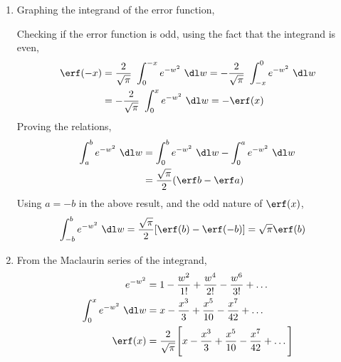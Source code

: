 \begin{enumerate}
    \item Graphing the integrand of the error function,
          \begin{figure}[H]
              \centering
          \end{figure}
          Checking if the error function is odd, using the fact that the integrand
          is even,
          \begin{align}
              \erf(-x) & = \frac{2}{\sqrt{\pi}}\ \int_{0}^{-x} e^{-w^2}\ \dl w
              = -\frac{2}{\sqrt{\pi}}\ \int_{-x}^{0} e^{-w^2}\ \dl w           \\
                       & = -\frac{2}{\sqrt{\pi}}\ \int_{0}^{x} e^{-w^2}\ \dl w
              = -\erf(x)
          \end{align}
          Proving the relations,
          \begin{align}
              \int_{a}^{b} e^{-w^2}\ \dl w & = \int_{0}^{b} e^{-w^2}\ \dl w
              - \int_{0}^{a} e^{-w^2}\ \dl w                                          \\
                                           & = \frac{\sqrt{\pi}}{2} (\erf b - \erf a)
          \end{align}
          Using $ a = -b $ in the above result, and the odd nature of $ \erf(x) $,
          \begin{align}
              \int_{-b}^{b} e^{-w^2}\ \dl w & = \frac{\sqrt{\pi}}{2}
              [\erf(b) - \erf(-b)] = \sqrt{\pi} \erf(b)
          \end{align}

    \item From the Maclaurin series of the integrand,
          \begin{align}
              e^{-w^2} & = 1 - \frac{w^2}{1!} + \frac{w^4}{2!} - \frac{w^6}{3!}
              + \dots                                                                  \\
              \int_{0}^{x} e^{-w^2}
              \ \dl w  & = x - \frac{x^3}{3} + \frac{x^5}{10} - \frac{x^7}{42} + \dots \\
              \erf(x)  & = \frac{2}{\sqrt{\pi}} \Bigg[ x - \frac{x^3}{3}
                  + \frac{x^5}{10} - \frac{x^7}{42} + \dots \Bigg]
          \end{align}


\end{enumerate}
